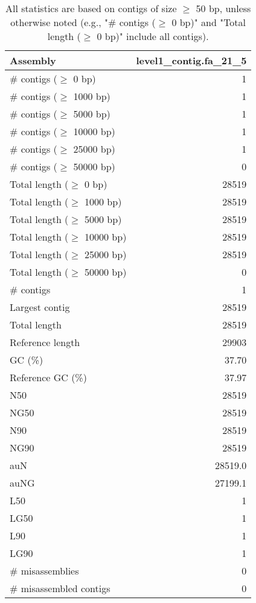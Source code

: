 \documentclass[12pt,a4paper]{article}
\begin{document}
\begin{table}[ht]
\begin{center}
\caption{All statistics are based on contigs of size $\geq$ 50 bp, unless otherwise noted (e.g., "\# contigs ($\geq$ 0 bp)" and "Total length ($\geq$ 0 bp)" include all contigs).}
\begin{tabular}{|l*{1}{|r}|}
\hline
Assembly & level1\_contig.fa\_21\_5 \\ \hline
\# contigs ($\geq$ 0 bp) & 1 \\ \hline
\# contigs ($\geq$ 1000 bp) & 1 \\ \hline
\# contigs ($\geq$ 5000 bp) & 1 \\ \hline
\# contigs ($\geq$ 10000 bp) & 1 \\ \hline
\# contigs ($\geq$ 25000 bp) & 1 \\ \hline
\# contigs ($\geq$ 50000 bp) & 0 \\ \hline
Total length ($\geq$ 0 bp) & 28519 \\ \hline
Total length ($\geq$ 1000 bp) & 28519 \\ \hline
Total length ($\geq$ 5000 bp) & 28519 \\ \hline
Total length ($\geq$ 10000 bp) & 28519 \\ \hline
Total length ($\geq$ 25000 bp) & 28519 \\ \hline
Total length ($\geq$ 50000 bp) & 0 \\ \hline
\# contigs & 1 \\ \hline
Largest contig & 28519 \\ \hline
Total length & 28519 \\ \hline
Reference length & 29903 \\ \hline
GC (\%) & 37.70 \\ \hline
Reference GC (\%) & 37.97 \\ \hline
N50 & 28519 \\ \hline
NG50 & 28519 \\ \hline
N90 & 28519 \\ \hline
NG90 & 28519 \\ \hline
auN & 28519.0 \\ \hline
auNG & 27199.1 \\ \hline
L50 & 1 \\ \hline
LG50 & 1 \\ \hline
L90 & 1 \\ \hline
LG90 & 1 \\ \hline
\# misassemblies & 0 \\ \hline
\# misassembled contigs & 0 \\ \hline

\end{tabular}
\end{center}
\end{table}
\end{document}
